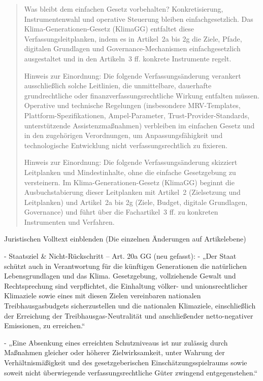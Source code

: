 \documentclass[12pt,a4paper]{scrartcl}
\begin{document}
\begin{quote}
Was bleibt dem einfachen Gesetz vorbehalten? Konkretisierung, Instrumentenwahl und operative Steuerung bleiben einfachgesetzlich. Das Klima-Generationen-Gesetz (KlimaGG) entfaltet diese Verfassungsleitplanken, indem es in Artikel 2a bis 2g die Ziele, Pfade, digitalen Grundlagen und Governance-Mechanismen einfachgesetzlich ausgestaltet und in den Artikeln 3 ff. konkrete Instrumente regelt.

Hinweis zur Einordnung: Die folgende Verfassungsänderung verankert ausschließlich solche Leitlinien, die unmittelbare, dauerhafte grundrechtliche oder finanzverfassungsrechtliche Wirkung entfalten müssen. Operative und technische Regelungen (insbesondere MRV-Templates, Plattform-Spezifikationen, Ampel-Parameter, Trust-Provider-Standards, unterstützende Assistenzmaßnahmen) verbleiben im einfachen Gesetz und in den zugehörigen Verordnungen, um Anpassungsfähigkeit und technologische Entwicklung nicht verfassungsrechtlich zu fixieren.

Hinweis zur Einordnung: Die folgende Verfassungsänderung skizziert Leitplanken und Mindestinhalte, ohne die einfache Gesetzgebung zu versteinern. Im Klima-Generationen-Gesetz (KlimaGG) beginnt die Ausbuchstabierung dieser Leitplanken mit Artikel 2 (Zielsetzung und Leitplanken) und Artikel 2a bis 2g (Ziele, Budget, digitale Grundlagen, Governance) und führt über die Fachartikel 3 ff. zu konkreten Instrumenten und Verfahren.
\end{quote}

Juristischen Volltext einblenden (Die einzelnen Änderungen auf Artikelebene)

- Staatsziel \& Nicht-Rückschritt -- Art. 20a GG (neu gefasst):
- „Der Staat schützt auch in Verantwortung für die künftigen Generationen die natürlichen Lebensgrundlagen und das Klima. Gesetzgebung, vollziehende Gewalt und Rechtsprechung sind verpflichtet, die Einhaltung völker- und unionsrechtlicher Klimaziele sowie eines mit diesen Zielen vereinbaren nationalen Treibhausgasbudgets sicherzustellen und die nationalen Klimaziele, einschließlich der Erreichung der Treibhausgas-Neutralität und anschließender netto-negativer Emissionen, zu erreichen.“

- „Eine Absenkung eines erreichten Schutzniveaus ist nur zulässig durch Maßnahmen gleicher oder höherer Zielwirksamkeit, unter Wahrung der Verhältnismäßigkeit und des gesetzgeberischen Einschätzungsspielraums sowie soweit nicht überwiegende verfassungsrechtliche Güter zwingend entgegenstehen.“
\end{document}

